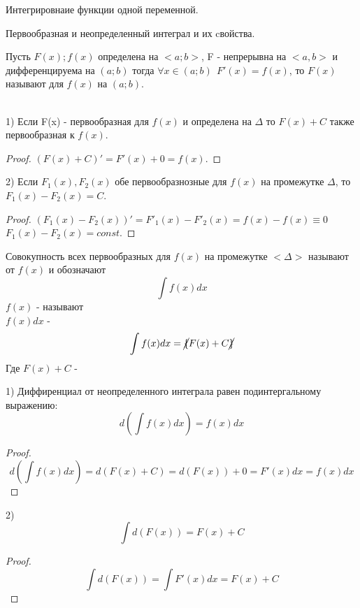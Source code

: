\begin{title}
  Интегрировнаие функции одной переменной.
\end{title}

\begin{title}[\Large]
  Первообразная и неопределенный интеграл и их cвойства.
\end{title}

\begin{defin}[первообразной]
  Пусть $F(x); f(x)$ определена на $<a;b>$, F - непрерывна на $<a,b>$ и
  дифференцируема на $(a;b)$ тогда $\forall x \in (a; b) ~~ F'(x) = f(x)$,
  то $F(x)$ называют  для $f(x)$ на $(a;b)$.
\end{defin}

\\
1) Если F(x) - первообразная для $f(x)$ и определена на $\Delta$ то $F(x) + C$
также первообразная к $f(x)$.\\
\begin{proof}
  $(F(x) + C)' = F'(x) + 0 = f(x)$.
\end{proof}

2) Если $F_{1}(x), F_{2}(x)$ обе первообразнозные для $f(x)$ на промежутке
$\Delta$, то $F_{1}(x) - F_{2}(x) = C$.\\
\begin{proof}
  $(F_{1}(x) - F_{2}(x))' = F'_{1}(x) - F'_{2}(x) = f(x) - f(x) \equiv 0$\\
  $F_{1}(x) - F_{2}(x) = const$.
\end{proof}

\begin{defin}
  Совокупность всех первообразных для $f(x)$ на промежутке $<\Delta>$ называют
   от $f(x)$ и обозначают
  \[\int f(x)dx\]
  $f(x)$ - называют \\
  $f(x)dx$ - 
  \[\int f(x)dx = \cancel{\{} F(x) + C \cancel{\}}\]
  Где $F(x) + C$ - 
\end{defin}

1) Диффиренциал от неопределенного интеграла равен подинтергальному выражению:
\[d \left ( \int f(x)dx \right ) = f(x)dx \]
\begin{proof}
  \[d \left ( \int f(x)dx \right ) = d(F(x) + C) = d(F(x)) + 0 = F'(x)dx
  = f(x)dx\]
\end{proof}

2) \[\int d(F(x)) = F(x) + C\]
\begin{proof}
  \[\int d(F(x)) = \int F'(x)dx = F(x) + C\]
\end{proof}

